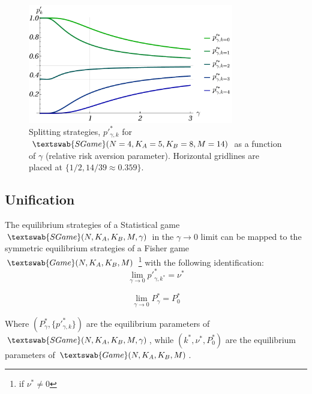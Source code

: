 \documentclass{beamer}
\theoremstyle{definition}
\newcommand{\G}[1]{$\textswab{Game}(#1)$}
\newcommand{\SG}[1]{$\textswab{SGame}(#1)$}
\begin{document}
\begin{frame}{}


    \begin{figure}[H]
    \centering
    \includegraphics[width=0.8\textwidth]{img/pp_gamma_4_5_8_14.pdf}
    \caption{\small \centering Splitting strategies, $p'^*_{\gamma,k}$ for \SG{N=4, K_A=5, K_B=8, M=14} as a function of $\gamma$ (relative risk aversion parameter). Horizontal gridlines are placed at $\{1/2 , 14/39 \approx 0.359 \}$.}
    \label{fig:pp(gamma)_45814}
\end{figure}

\end{frame}

\subsection{Unification}

\begin{frame}{}

    \begin{theorem}
    The equilibrium strategies of a Statistical game \SG{N,K_A,K_B,M,\gamma} in the $\gamma \to 0$ limit can be mapped to the symmetric equilibrium strategies of a Fisher game \G{N,K_A,K_B,M} \footnote{if $\nu^* \ne 0$} with the following identification:
    \begin{equation}
        \lim_{\gamma \to 0} p'^*_{\gamma,k^*} = \nu^*
    \end{equation}
        
    \begin{equation}
        \lim_{\gamma \to 0} P^*_\gamma = P^*_0
    \end{equation}

    Where $(P^*_\gamma,\{p'^*_{\gamma,k}\})$ are the equilibrium parameters of 
    \SG{N,K_A,K_B,M,\gamma},
    while $(k^*,\nu^*,P^*_0)$ are the equilibrium parameters of 
    \G{N,K_A,K_B,M}.
    
\end{theorem}

\end{frame}
\end{document}
